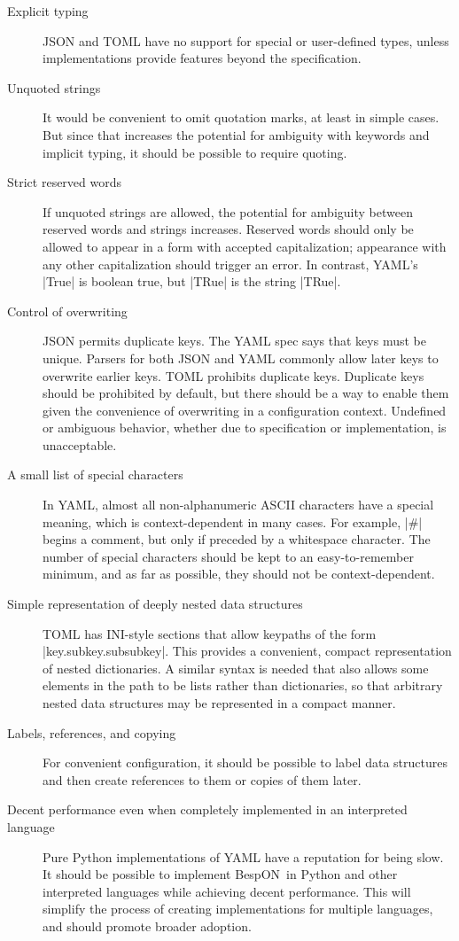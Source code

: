 \documentclass[11pt]{article}
\newcommand{\bespon}{BespON}
\begin{document}
\begin{description}
\item[Explicit typing]  JSON and TOML have no support for special or user-defined types, unless implementations provide features beyond the specification.

\item[Unquoted strings]  It would be convenient to omit quotation marks, at least in simple cases.  But since that increases the potential for ambiguity with keywords and implicit typing, it should be possible to require quoting.

\item[Strict reserved words]  If unquoted strings are allowed, the potential for ambiguity between reserved words and strings increases.  Reserved words should only be allowed to appear in a form with accepted capitalization; appearance with any other capitalization should trigger an error.  In contrast, YAML's |True| is boolean true, but |TRue| is the string |TRue|.

\item[Control of overwriting] JSON permits duplicate keys.  The YAML spec says that keys must be unique.  Parsers for both JSON and YAML commonly allow later keys to overwrite earlier keys.  TOML prohibits duplicate keys.  Duplicate keys should be prohibited by default, but there should be a way to enable them given the convenience of overwriting in a configuration context.  Undefined or ambiguous behavior, whether due to specification or implementation, is unacceptable.

\item[A small list of special characters] In YAML, almost all non-alphanumeric ASCII characters have a special meaning, which is context-dependent in many cases.  For example, |#| begins a comment, but only if preceded by a whitespace character.  The number of special characters should be kept to an easy-to-remember minimum, and as far as possible, they should not be context-dependent.  

\item[Simple representation of deeply nested data structures]  TOML has INI-style sections that allow keypaths of the form |key.subkey.subsubkey|.  This provides a convenient, compact representation of nested dictionaries.  A similar syntax is needed that also allows some elements in the path to be lists rather than dictionaries, so that arbitrary nested data structures may be represented in a compact manner.

\item[Labels, references, and copying]  For convenient configuration, it should be possible to label data structures and then create references to them or copies of them later.

\item[Decent performance even when completely implemented in an interpreted language]  Pure Python implementations of YAML have a reputation for being slow.  It should be possible to implement \bespon\ in Python and other interpreted languages while achieving decent performance.  This will simplify the process of creating implementations for multiple languages, and should promote broader adoption.
\end{description}
\end{document}
